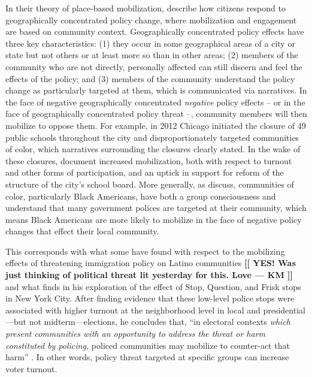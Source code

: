 \documentclass[12pt]{article}
\newcommand{\kmcomment}[1]{\textbf{\textcolor{JungleGreen}{[[ #1 --- KM ]]}}}
\begin{document}
In their theory of place-based mobilization, \cite{nuamah2021close} describe how citizens respond to geographically concentrated policy change, where mobilization and engagement are based on community context. Geographically concentrated policy effects have three key characteristics: (1) they occur in some geographical areas of a city or state but not others or at least more so than in other areas; (2) members of the community who are not directly, personally affected can still discern and feel the effects of the policy; and (3) members of the community understand the policy change as particularly targeted at them, which is communicated via narratives. In the face of negative geographically concentrated \textit{negative} policy effects -- or in the face of geographically concentrated policy threat --, community members will then mobilize to oppose them. For example, in 2012 Chicago initiated the closure of 49 public schools throughout the city and disproportionately targeted communities of color, which narratives surrounding the closures clearly stated. In the wake of these closures, \cite{nuamah2021close} document increased mobilization, both with respect to turnout and other forms of participation, and an uptick in support for reform of the structure of the city's school board. More generally, as \cite{garciarios2021implications} discuss, communities of color, particularly Black Americans, have both a group consciousness and understand that many government polices are targeted at their community, which means Black Americans are more likely to mobilize in the face of negative policy changes that effect their local community.   

This corresponds with what some have found with respect to the mobilizing effects of threatening immigration policy on Latino communities \citep{pantoja2003fear,barreto2009mobilization}\kmcomment{YES! Was just thinking of political threat lit yesterday for this. Love} and what \cite{Laniyonu2019} finds in his exploration of the effect of Stop, Question, and Frisk stops in New York City. After finding evidence that these low-level police stops were associated with higher turnout at the neighborhood level in local and presidential---but not midterm---elections, he concludes that, ``in electoral contexts \textit{which present communities with an opportunity to address the threat or harm constituted by policing,} policed communities may mobilize to counter-act that harm'' \citep[][551, emphasis added]{Laniyonu2019}. In other words, policy threat targeted at specific groups can increase voter turnout. 
\end{document}
